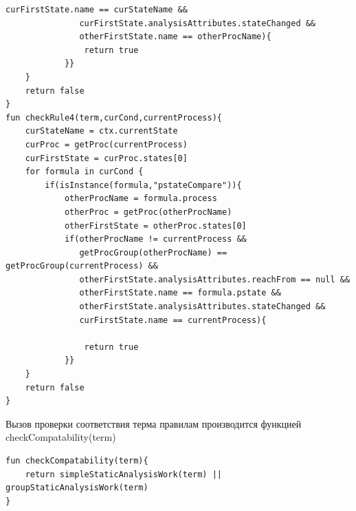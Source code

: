 \begin{lstlisting}[style=PseudoStyle,mathescape=true]
               curFirstState.name == curStateName &&
               curFirstState.analysisAttributes.stateChanged &&
               otherFirstState.name == otherProcName){
                return true
            }}
    }
    return false
}
fun checkRule4(term,curCond,currentProcess){
    curStateName = ctx.currentState
    curProc = getProc(currentProcess)
    curFirstState = curProc.states[0]
    for formula in curCond {
        if(isInstance(formula,"pstateCompare")){
            otherProcName = formula.process
            otherProc = getProc(otherProcName)
            otherFirstState = otherProc.states[0]
            if(otherProcName != currentProcess &&
               getProcGroup(otherProcName) == getProcGroup(currentProcess) &&
               otherFirstState.analysisAttributes.reachFrom == null &&
               otherFirstState.name == formula.pstate &&
               otherFirstState.analysisAttributes.stateChanged &&
               curFirstState.name == currentProcess){

                return true
            }}
    }
    return false
}
\end{lstlisting}

Вызов проверки соответствия терма правилам производится функцией checkCompatability(term)

\begin{lstlisting}[style=PseudoStyle,mathescape=true]
fun checkCompatability(term){
    return simpleStaticAnalysisWork(term) || groupStaticAnalysisWork(term)
}
\end{lstlisting}
